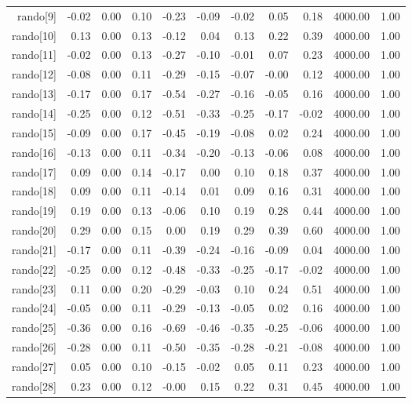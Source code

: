 \begin{table}[ht]
\begin{tabular}{rrrrrrrrrrr}
  rando[9] & -0.02 & 0.00 & 0.10 & -0.23 & -0.09 & -0.02 & 0.05 & 0.18 & 4000.00 & 1.00 \\ 
  rando[10] & 0.13 & 0.00 & 0.13 & -0.12 & 0.04 & 0.13 & 0.22 & 0.39 & 4000.00 & 1.00 \\ 
  rando[11] & -0.02 & 0.00 & 0.13 & -0.27 & -0.10 & -0.01 & 0.07 & 0.23 & 4000.00 & 1.00 \\ 
  rando[12] & -0.08 & 0.00 & 0.11 & -0.29 & -0.15 & -0.07 & -0.00 & 0.12 & 4000.00 & 1.00 \\ 
  rando[13] & -0.17 & 0.00 & 0.17 & -0.54 & -0.27 & -0.16 & -0.05 & 0.16 & 4000.00 & 1.00 \\ 
  rando[14] & -0.25 & 0.00 & 0.12 & -0.51 & -0.33 & -0.25 & -0.17 & -0.02 & 4000.00 & 1.00 \\ 
  rando[15] & -0.09 & 0.00 & 0.17 & -0.45 & -0.19 & -0.08 & 0.02 & 0.24 & 4000.00 & 1.00 \\ 
  rando[16] & -0.13 & 0.00 & 0.11 & -0.34 & -0.20 & -0.13 & -0.06 & 0.08 & 4000.00 & 1.00 \\ 
  rando[17] & 0.09 & 0.00 & 0.14 & -0.17 & 0.00 & 0.10 & 0.18 & 0.37 & 4000.00 & 1.00 \\ 
  rando[18] & 0.09 & 0.00 & 0.11 & -0.14 & 0.01 & 0.09 & 0.16 & 0.31 & 4000.00 & 1.00 \\ 
  rando[19] & 0.19 & 0.00 & 0.13 & -0.06 & 0.10 & 0.19 & 0.28 & 0.44 & 4000.00 & 1.00 \\ 
  rando[20] & 0.29 & 0.00 & 0.15 & 0.00 & 0.19 & 0.29 & 0.39 & 0.60 & 4000.00 & 1.00 \\ 
  rando[21] & -0.17 & 0.00 & 0.11 & -0.39 & -0.24 & -0.16 & -0.09 & 0.04 & 4000.00 & 1.00 \\ 
  rando[22] & -0.25 & 0.00 & 0.12 & -0.48 & -0.33 & -0.25 & -0.17 & -0.02 & 4000.00 & 1.00 \\ 
  rando[23] & 0.11 & 0.00 & 0.20 & -0.29 & -0.03 & 0.10 & 0.24 & 0.51 & 4000.00 & 1.00 \\ 
  rando[24] & -0.05 & 0.00 & 0.11 & -0.29 & -0.13 & -0.05 & 0.02 & 0.16 & 4000.00 & 1.00 \\ 
  rando[25] & -0.36 & 0.00 & 0.16 & -0.69 & -0.46 & -0.35 & -0.25 & -0.06 & 4000.00 & 1.00 \\ 
  rando[26] & -0.28 & 0.00 & 0.11 & -0.50 & -0.35 & -0.28 & -0.21 & -0.08 & 4000.00 & 1.00 \\ 
  rando[27] & 0.05 & 0.00 & 0.10 & -0.15 & -0.02 & 0.05 & 0.11 & 0.23 & 4000.00 & 1.00 \\ 
  rando[28] & 0.23 & 0.00 & 0.12 & -0.00 & 0.15 & 0.22 & 0.31 & 0.45 & 4000.00 & 1.00 \\ 

\end{tabular}
\end{table}
